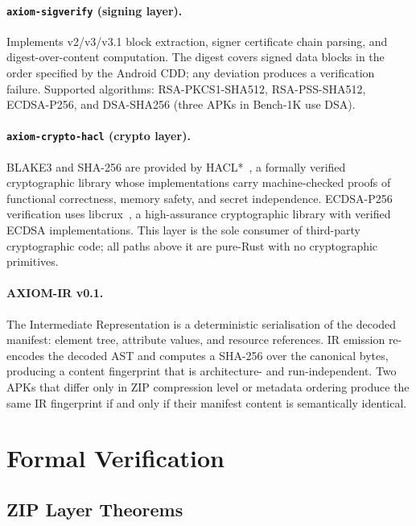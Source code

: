 \documentclass[runningheads]{llncs}
\begin{document}
\paragraph{\texttt{axiom-sigverify} (signing layer).}
Implements v2/v3/v3.1 block extraction, signer certificate chain parsing,
and digest-over-content computation.  The digest covers signed data blocks in
the order specified by the Android CDD; any deviation produces a verification
failure.  Supported algorithms: RSA-PKCS1-SHA512, RSA-PSS-SHA512, ECDSA-P256,
and DSA-SHA256 (three APKs in Bench-1K use DSA).

\paragraph{\texttt{axiom-crypto-hacl} (crypto layer).}
BLAKE3 and SHA-256 are provided by HACL*~\cite{hacl}, a formally verified
cryptographic library whose implementations carry machine-checked proofs of
functional correctness, memory safety, and secret independence.
ECDSA-P256 verification uses libcrux~\cite{libcrux}, a high-assurance
cryptographic library with verified ECDSA implementations.
This layer is the sole consumer of third-party cryptographic code; all paths
above it are pure-Rust with no cryptographic primitives.

\paragraph{AXIOM-IR v0.1.}
The Intermediate Representation is a deterministic serialisation of the decoded
manifest: element tree, attribute values, and resource references.
IR emission re-encodes the decoded AST and computes a SHA-256 over the
canonical bytes, producing a content fingerprint that is architecture- and
run-independent.  Two APKs that differ only in ZIP compression level or
metadata ordering produce the same IR fingerprint if and only if their manifest
content is semantically identical.

\section{Formal Verification}
\label{sec:verification}

\subsection{ZIP Layer Theorems}
\end{document}
